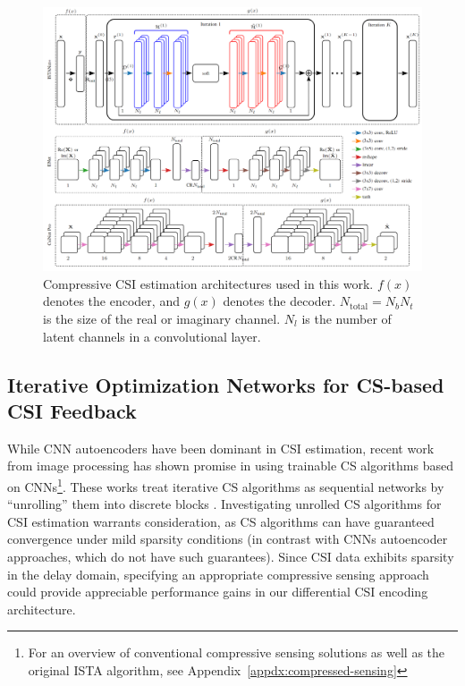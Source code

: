 \begin{figure}[!hbtp]
    \centering
    \includegraphics[width=\linewidth]{images/arch-comparison.png}
    \caption{Compressive CSI estimation architectures used in this work. $f(x)$ denotes the encoder, and $g(x)$ denotes the decoder. $N_{\text{total}}=N_bN_t$ is the size of the real or imaginary channel. $N_l$ is the number of latent channels in a convolutional layer.}
    \label{fig:arch_compare}
\end{figure}

\subsection{Iterative Optimization Networks for CS-based CSI Feedback} \label{sec:iter-cs}

 
While CNN autoencoders have been dominant in CSI estimation, recent work from image processing has shown promise in using trainable CS algorithms based on CNNs\footnote{For an overview of conventional compressive sensing solutions as well as the original ISTA algorithm, see Appendix~\ref{appdx:compressed-sensing}}. These works treat iterative CS algorithms as sequential networks by ``unrolling'' them into discrete blocks \cite{ref:yang2016deep, ref:zhang2018ista}. Investigating unrolled CS algorithms for CSI estimation warrants consideration, as CS algorithms can have guaranteed convergence under mild sparsity conditions (in contrast with CNNs autoencoder approaches, which do not have such guarantees). Since CSI data exhibits sparsity in the delay domain, specifying an appropriate compressive sensing approach could provide appreciable performance gains in our differential CSI encoding architecture. 

